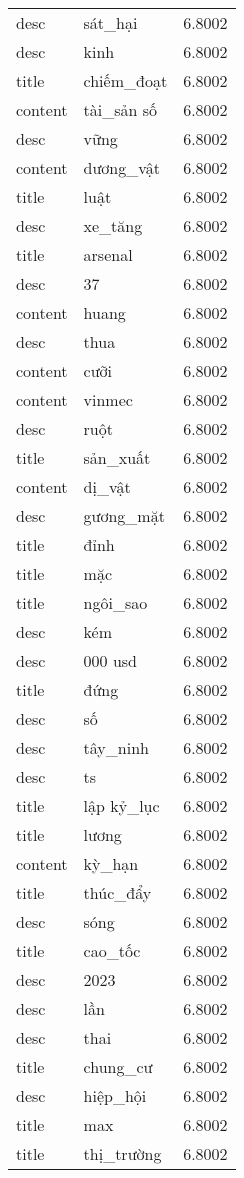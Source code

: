 \documentclass{article}
\begin{document}
\begin{tabular}{lll}
desc & sát\_hại & 6.8002\\
desc & kinh & 6.8002\\
title & chiếm\_đoạt & 6.8002\\
content & tài\_sản số & 6.8002\\
desc & vững & 6.8002\\
content & dương\_vật & 6.8002\\
title & luật & 6.8002\\
desc & xe\_tăng & 6.8002\\
title & arsenal & 6.8002\\
desc & 37 & 6.8002\\
content & huang & 6.8002\\
desc & thua & 6.8002\\
content & cưỡi & 6.8002\\
content & vinmec & 6.8002\\
desc & ruột & 6.8002\\
title & sản\_xuất & 6.8002\\
content & dị\_vật & 6.8002\\
desc & gương\_mặt & 6.8002\\
title & đỉnh & 6.8002\\
title & mặc & 6.8002\\
title & ngôi\_sao & 6.8002\\
desc & kém & 6.8002\\
desc & 000 usd & 6.8002\\
title & đứng & 6.8002\\
desc & số & 6.8002\\
desc & tây\_ninh & 6.8002\\
desc & ts & 6.8002\\
title & lập kỷ\_lục & 6.8002\\
title & lương & 6.8002\\
content & kỳ\_hạn & 6.8002\\
title & thúc\_đẩy & 6.8002\\
desc & sóng & 6.8002\\
title & cao\_tốc & 6.8002\\
desc & 2023 & 6.8002\\
desc & lần & 6.8002\\
desc & thai & 6.8002\\
title & chung\_cư & 6.8002\\
desc & hiệp\_hội & 6.8002\\
title & max & 6.8002\\
title & thị\_trường & 6.8002\\

\end{tabular}
\end{document}
